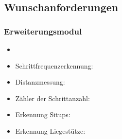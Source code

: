 \documentclass[a4paper,12pt]{article}
\begin{document}
  \subsection{Wunschanforderungen}
    \subsubsection{Erweiterungsmodul}
    \begin{itemize}
      \item[] 
      \item[] \textsf{Schrittfrequenzerkennung:} 
      \item[] \textsf{Distanzmessung:}
      \item[] \textsf{Zähler der Schrittanzahl:}
      \item[] \textsf{Erkennung Situps:}
      \item[] \textsf{Erkennung Liegestütze:}   
    \end{itemize}
\end{document}
